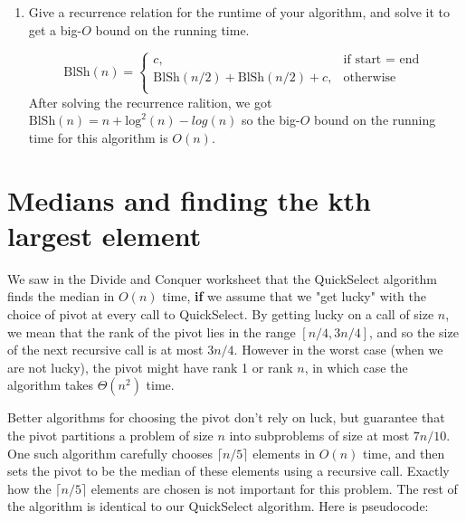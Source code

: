 \documentclass[11pt]{article}
\def\question#1{\red{#1}}
\def\soln#1{\par\blu{#1}} %
\def\blu#1{{\color{blu}#1}}
\def\red#1{{\color{red}#1}}
\begin{document}
\begin{enumerate}
\item \question{Give a recurrence relation for the runtime of your algorithm, and solve it to get a big-$O$ bound on the running time.}
\soln{
  \[
   \mbox{BlSh}(n) = \left \{\begin{array}{ll}
      c, & \mbox{if start = end } \\[.3in]
      \text{BlSh}(n/2) + \text{BlSh}(n/2) + c, & \mbox{otherwise} \\
      \end{array} \right.
   \]
   After solving the recurrence ralition, we got $ \text{BlSh}(n) = n + \text{log}^2(n) - log(n) $
   so the big-$O$ bound on the running time for this 
   algorithm is $O(n)$.
}
\end{enumerate}
\section{Medians and finding the kth largest element}
\label{sec-2}
We saw in the Divide and Conquer worksheet that the QuickSelect
algorithm finds the median in $O(n)$ time, \textbf{if} we assume that we "get
lucky" with the choice of pivot at every call to QuickSelect. By getting
lucky on a call of size $n$, we mean that the rank of the pivot lies
in the range $[n/4,3n/4]$, and so the size of the next recursive call is at
most $3n/4$.  However in the worst case (when we are not lucky),
the pivot might have rank 1 or rank $n$, in which
case the algorithm takes $\Theta(n^2)$ time.

Better algorithms for choosing the pivot don't rely on luck, but
guarantee that the pivot partitions a problem of size $n$ into subproblems of
size at most $7n/10$. One such algorithm carefully chooses $\lceil n/5 \rceil$
elements in $O(n)$ time, and then sets the pivot to be the median
of these elements using a recursive call.  Exactly how the $\lceil n/5 \rceil$
elements are chosen is not important for this problem.  The rest of
the algorithm is identical to our QuickSelect algorithm. Here is
pseudocode:
\end{document}
